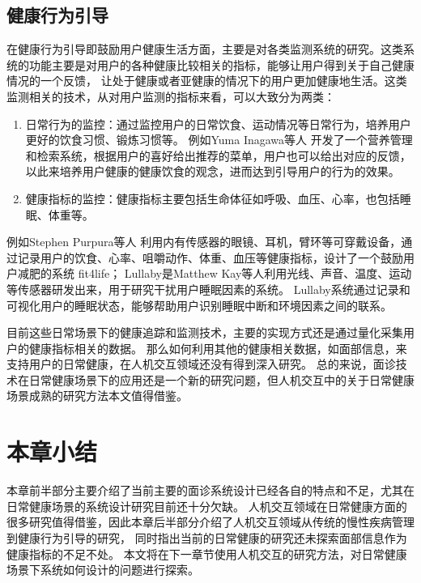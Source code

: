 \subsection{健康行为引导}
在健康行为引导即鼓励用户健康生活方面，主要是对各类监测系统的研究。这类系统的功能主要是对用户的各种健康比较相关的指标，能够让用户得到关于自己健康情况的一个反馈，
让处于健康或者亚健康的情况下的用户更加健康地生活。这类监测相关的技术，从对用户监测的指标来看，可以大致分为两类：
\begin{enumerate}

    \item 日常行为的监控：通过监控用户的日常饮食、运动情况等日常行为，培养用户更好的饮食习惯、锻炼习惯等\cite{purpura2011fit4life, Inagawa2013A,bravata2007using,cordeiro2015barriers,lin2006fish, miller2014stepstream}。 例如Yuma Inagawa等人\cite{Inagawa2013A} 开发了一个营养管理和检索系统，根据用户的喜好给出推荐的菜单，用户也可以给出对应的反馈，以此来培养用户健康的健康饮食的观念，进而达到引导用户的行为的效果。

    \item 健康指标的监控：健康指标主要包括生命体征如呼吸、血压、心率，也包括睡眠、体重等\cite{kay2012lullaby, gronvall2013beyond}。
    
\end{enumerate}

例如Stephen Purpura等人\cite{purpura2011fit4life} 利用内有传感器的眼镜、耳机，臂环等可穿戴设备，通过记录用户的饮食、心率、咀嚼动作、体重、血压等健康指标，设计了一个鼓励用户减肥的系统 fit4life； 
Lullaby\cite{kay2012lullaby}是Matthew Kay等人利用光线、声音、温度、运动等传感器研发出来，用于研究干扰用户睡眠因素的系统。
Lullaby系统通过记录和可视化用户的睡眠状态，能够帮助用户识别睡眠中断和环境因素之间的联系。 


目前这些日常场景下的健康追踪和监测技术，主要的实现方式还是通过量化采集用户的健康指标相关的数据。
那么如何利用其他的健康相关数据，如面部信息，来支持用户的日常健康，在人机交互领域还没有得到深入研究。
总的来说，面诊技术在日常健康场景下的应用还是一个新的研究问题，但人机交互中的关于日常健康场景成熟的研究方法本文值得借鉴。


\section{本章小结}
本章前半部分主要介绍了当前主要的面诊系统设计已经各自的特点和不足，尤其在日常健康场景的系统设计研究目前还十分欠缺。
人机交互领域在日常健康方面的很多研究值得借鉴，因此本章后半部分介绍了人机交互领域从传统的慢性疾病管理到健康行为引导的研究，
同时指出当前的日常健康的研究还未探索面部信息作为健康指标的不足不处。
本文将在下一章节使用人机交互的研究方法，对日常健康场景下系统如何设计的问题进行探索。